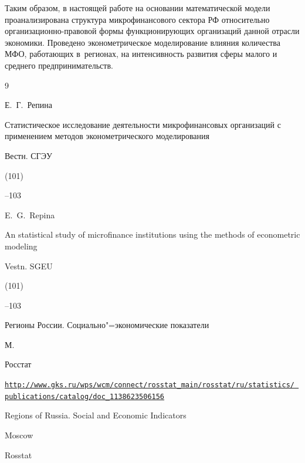 Таким образом, в настоящей работе  на основании математической модели проанализирована структура микрофинансового сектора РФ относительно организационно-правовой формы функционирующих организаций данной отрасли экономики. Проведено эконометрическое моделирование влияния количества МФО, работающих в~регионах, на интенсивность развития сферы малого и среднего предпринимательств.



\begin{thebibliography}{9}




\by Е.~Г.~Репина

\paper Статистическое исследование деятельности микрофинансовых организаций с применением методов эконометрического моделирования 

\jour Вестн. СГЭУ


(101)

--103

\misctransl

\by E.~G.~Repina

\paper An statistical study of microfinance institutions using the methods of econometric modeling

\jour Vestn. SGEU


(101)

--103






\book Регионы России. Социально"=экономические показатели

\publaddr М.

\publ Росстат



\elink \href{http://www.gks.ru/wps/wcm/connect/rosstat_main/rosstat/ru/statistics/publications/catalog/doc_1138623506156}{\tt http://www.gks.ru/wps/wcm/connect/rosstat\_main/rosstat/ru/statistics/ publications/catalog/doc\_1138623506156}

\misctransl

\book Regions of Russia. Social and Economic Indicators

\publaddr Moscow

\publ Rosstat


\end{thebibliography}
